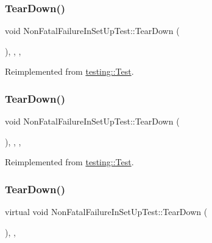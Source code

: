 \subsubsection{\texorpdfstring{TearDown()}{TearDown()}\hspace{0.1cm}{\footnotesize\ttfamily [1/3]}}
{\footnotesize\ttfamily void Non\+Fatal\+Failure\+In\+Set\+Up\+Test\+::\+Tear\+Down (\begin{DoxyParamCaption}{ }\end{DoxyParamCaption})\hspace{0.3cm}{\ttfamily [inline]}, {\ttfamily [override]}, {\ttfamily [protected]}, {\ttfamily [virtual]}}



Reimplemented from \mbox{\hyperlink{classtesting_1_1_test_a5f0ab439802cbe0ef7552f1a9f791923}{testing\+::\+Test}}.

\mbox{\label{class_non_fatal_failure_in_set_up_test_a564b41b4e07d4e9c6921d1f2e1be9352}} 
\subsubsection{\texorpdfstring{TearDown()}{TearDown()}\hspace{0.1cm}{\footnotesize\ttfamily [2/3]}}
{\footnotesize\ttfamily void Non\+Fatal\+Failure\+In\+Set\+Up\+Test\+::\+Tear\+Down (\begin{DoxyParamCaption}{ }\end{DoxyParamCaption})\hspace{0.3cm}{\ttfamily [inline]}, {\ttfamily [override]}, {\ttfamily [protected]}, {\ttfamily [virtual]}}



Reimplemented from \mbox{\hyperlink{classtesting_1_1_test_a5f0ab439802cbe0ef7552f1a9f791923}{testing\+::\+Test}}.

\mbox{\label{class_non_fatal_failure_in_set_up_test_a36abc808b11afc6a9bfa20dac5c28c30}} 
\subsubsection{\texorpdfstring{TearDown()}{TearDown()}\hspace{0.1cm}{\footnotesize\ttfamily [3/3]}}
{\footnotesize\ttfamily virtual void Non\+Fatal\+Failure\+In\+Set\+Up\+Test\+::\+Tear\+Down (\begin{DoxyParamCaption}{ }\end{DoxyParamCaption})\hspace{0.3cm}{\ttfamily [inline]}, {\ttfamily [protected]}, {\ttfamily [virtual]}}



